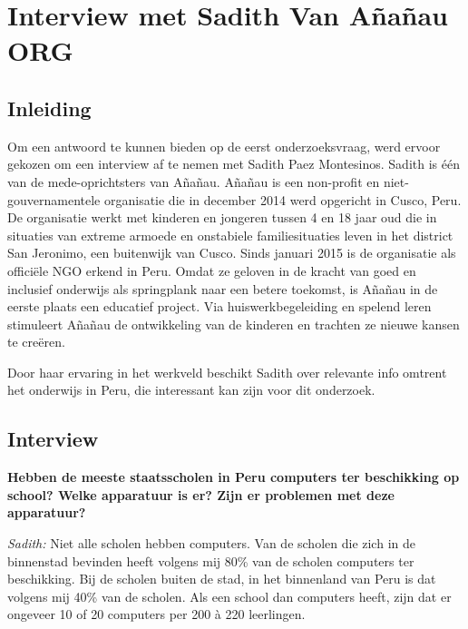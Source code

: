 
\chapter{Interview met Sadith Van Añañau ORG}
\label{ch:interviewMetSadith}

\section{Inleiding}
Om een antwoord te kunnen bieden op de eerst onderzoeksvraag, werd ervoor gekozen om een interview af te nemen met Sadith Paez Montesinos. Sadith is één van de mede-oprichtsters van Añañau. Añañau is een non-profit en niet-gouvernamentele organisatie die in december 2014 werd opgericht in Cusco, Peru. De organisatie werkt met kinderen en jongeren tussen 4 en 18 jaar oud die in situaties van extreme armoede en onstabiele familiesituaties leven in het district San Jeronimo, een buitenwijk van Cusco. Sinds januari 2015 is de organisatie als officiële NGO erkend in Peru. Omdat ze geloven in de kracht van goed en inclusief onderwijs als springplank naar een betere toekomst, is Añañau in de eerste plaats een educatief project. Via huiswerkbegeleiding en spelend leren stimuleert Añañau de ontwikkeling van de kinderen en trachten ze nieuwe kansen te creëren. \autocite{Ananau2020}

Door haar ervaring in het werkveld beschikt Sadith over relevante info omtrent het onderwijs in Peru, die interessant kan zijn voor dit onderzoek. 

\section{Interview}
\textbf{Hebben de meeste staatsscholen in Peru computers ter beschikking op school? Welke apparatuur is er? Zijn er problemen met deze apparatuur?}

\textit{Sadith:} Niet alle scholen hebben computers. Van de scholen die zich in de binnenstad bevinden heeft volgens mij 80\% van de scholen computers ter beschikking. Bij de scholen buiten de stad, in het binnenland van Peru is dat volgens mij 40\% van de scholen. Als een school dan computers heeft, zijn dat er ongeveer 10 of 20 computers per 200 à 220 leerlingen.

